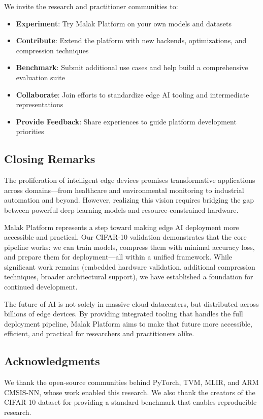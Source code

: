 We invite the research and practitioner communities to:
\begin{itemize}
\item \textbf{Experiment}: Try Malak Platform on your own models and datasets
\item \textbf{Contribute}: Extend the platform with new backends, optimizations, and compression techniques
\item \textbf{Benchmark}: Submit additional use cases and help build a comprehensive evaluation suite
\item \textbf{Collaborate}: Join efforts to standardize edge AI tooling and intermediate representations
\item \textbf{Provide Feedback}: Share experiences to guide platform development priorities
\end{itemize}

\subsection{Closing Remarks}

The proliferation of intelligent edge devices promises transformative applications across domains—from healthcare and environmental monitoring to industrial automation and beyond. However, realizing this vision requires bridging the gap between powerful deep learning models and resource-constrained hardware.

Malak Platform represents a step toward making edge AI deployment more accessible and practical. Our CIFAR-10 validation demonstrates that the core pipeline works: we can train models, compress them with minimal accuracy loss, and prepare them for deployment—all within a unified framework. While significant work remains (embedded hardware validation, additional compression techniques, broader architectural support), we have established a foundation for continued development.

The future of AI is not solely in massive cloud datacenters, but distributed across billions of edge devices. By providing integrated tooling that handles the full deployment pipeline, Malak Platform aims to make that future more accessible, efficient, and practical for researchers and practitioners alike.

\subsection*{Acknowledgments}

We thank the open-source communities behind PyTorch, TVM, MLIR, and ARM CMSIS-NN, whose work enabled this research. We also thank the creators of the CIFAR-10 dataset for providing a standard benchmark that enables reproducible research.

